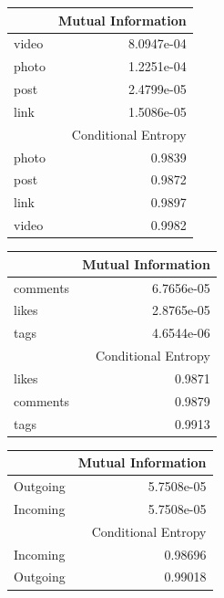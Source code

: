 \documentclass[letterpaper]{article}
\begin{document}
\begin{table}
	\begin{tabular}{| >{\small}l | >{\small}r |}
		\hline
		 & Mutual Information\\
		\hline
		video & 8.0947e-04 \\
		\hline
		photo & 1.2251e-04 \\
		\hline 
		post & 2.4799e-05\\
		\hline
		link & 1.5086e-05\\
		\hline
		\hline
		& Conditional Entropy\\
		\hline
		photo & 0.9839\\
		\hline
		post & 0.9872\\
		\hline
		link & 0.9897\\
		\hline
		video & 0.9982\\
		\hline
	\end{tabular}
\end{table}

\begin{table}

	\begin{tabular}{| >{\small}l | >{\small}r |}
		\hline
		 & Mutual Information\\
		\hline
		comments & 6.7656e-05\\
		\hline
		likes & 2.8765e-05 \\
		\hline 
		tags & 4.6544e-06\\
		\hline
		\hline
		& Conditional Entropy\\
		\hline
		likes & 0.9871\\
		\hline
		comments & 0.9879\\
		\hline
		tags & 0.9913\\
		\hline
	\end{tabular}
\end{table}


\begin{table}
	\begin{tabular}{| >{\small}l | >{\small}r |}
		\hline
		 & Mutual Information\\
		\hline
		Outgoing & 5.7508e-05\\
		\hline
		Incoming &  5.7508e-05 \\
		\hline 
		\hline
		& Conditional Entropy\\
		\hline
		Incoming & 0.98696\\
		\hline
		Outgoing & 0.99018\\
		\hline
		
	\end{tabular}
\end{table}
\end{document}
